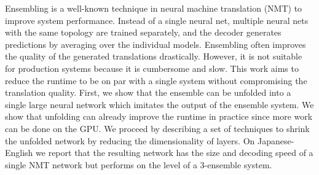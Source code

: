 Ensembling is a well-known technique in neural machine translation (NMT) to improve system performance. Instead of a single neural net, multiple neural nets with the same topology are trained separately, and the decoder generates predictions by averaging over the individual models. Ensembling often improves the quality of the generated translations drastically. However, it is not suitable for production systems because it is cumbersome and slow. This work aims to reduce the runtime to be on par with a single system without compromising the translation quality. First, we show that the ensemble can be unfolded into a single large neural network which imitates the output of the ensemble system. We show that unfolding can already improve the runtime in practice since more work can be done on the GPU. We proceed by describing a set of techniques to shrink the unfolded network by reducing the dimensionality of layers. On Japanese-English we report that the resulting network has the size and decoding speed of a single NMT network but performs on the level of a 3-ensemble system.
